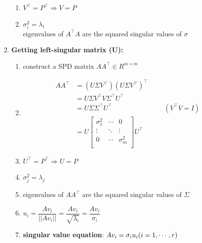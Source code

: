 \begin{enumerate}
\begin{enumerate}
\begin{enumerate}
            \item $V^\top = P^\top \Rightarrow V = P$

            \item $\sigma _i^2 = \lambda_i$\\
            eigenvalues of $A^\top A$ are the squared singular values of $\sigma$ 

        \end{enumerate}

        \vspace{0.2cm}
        \item \textbf{Getting left-singular matrix (U):}
        \begin{enumerate}
            \item construct a SPD matrix $AA^\top \in R^{m\times m}$
            
            \item \begin{align*}
                AA^\top 
                &= (U\Sigma V^\top )(U\Sigma V^\top )^\top \\
                &= U\Sigma V^\top V\Sigma^\top U^\top  \\
                &= U\Sigma \Sigma^\top U^\top  &&& (V^\top V = I) \\
                &= U \begin{bmatrix}
                    \sigma_1^2 & \cdots & 0 \\
                    \vdots & \ddots & \vdots \\
                    0 & \cdots & \sigma_m^2\\
                \end{bmatrix} U^\top
            \end{align*}

            \item $U^\top = P^\top \Rightarrow  U = P$
     
            \item $\sigma_j^2 = \lambda_j$
     
            \item eigenvalues of $AA^\top$ are the squared singular values of $\Sigma$

            \item \( \displaystyle u_i = \dfrac{Av_i}{||Av_i||} = \dfrac{Av_i}{\sqrt{\lambda_i}} = \dfrac{Av_i}{\sigma_i} \)

            \item \textbf{singular value equation}: $ Av_i = \sigma_iu_i  \hfill (i = 1, \cdots , r)$
        \end{enumerate}


\end{enumerate}
\end{enumerate}
